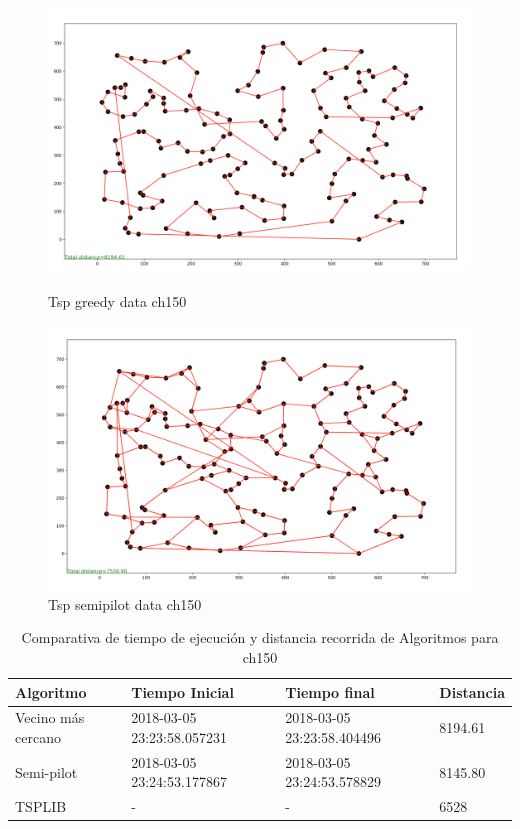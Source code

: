 \documentclass{article}
\begin{document}
\begin{figure}[H]
	\begin{minipage}{0.5\textwidth}
		\centering
		\includegraphics[width=1\textwidth]{../image/greedy/greedy-ch150.png}
		\caption{\label{fig:Figura1} Tsp greedy data ch150}
	\end{minipage}\hfill
	\begin {minipage}{0.5\textwidth}
		\centering
		\includegraphics[width=1\textwidth]{../image/semipilot/semipilot-ch150-2-4.png}
		\caption{\label{fig:Figura1} Tsp semipilot data ch150}
	\end{minipage}
\end{figure}

\begin{table}[H]
\centering
\caption{Comparativa de tiempo de ejecución y distancia recorrida de Algoritmos para ch150}
\label{Table:ch150}
\begin{tabular}{| l | l | l | l |}
\hline
Algoritmo & Tiempo Inicial & Tiempo final & Distancia \\ \hline
Vecino más cercano & 2018-03-05 23:23:58.057231 & 2018-03-05 23:23:58.404496 & 8194.61 \\ \hline
Semi-pilot & 2018-03-05 23:24:53.177867 & 2018-03-05 23:24:53.578829 & 8145.80 \\ \hline
TSPLIB & - & - & 6528 \\ \hline

\end{tabular}
\end{table}
\end{document}
